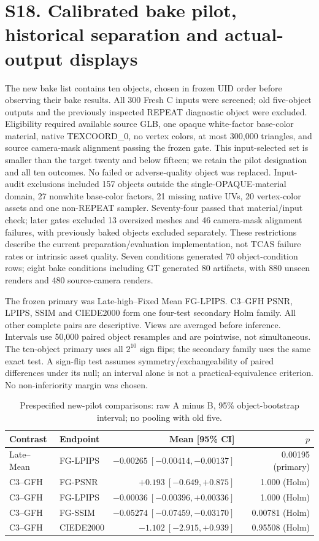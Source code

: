\documentclass[11pt]{article}
\begin{document}
\clearpage
\section*{S18. Calibrated bake pilot, historical separation and actual-output displays}
The new bake list contains ten objects, chosen in frozen UID order before observing their bake results. All 300 Fresh C inputs were screened; old five-object outputs and the previously inspected REPEAT diagnostic object were excluded. Eligibility required available source GLB, one opaque white-factor base-color material, native TEXCOORD\_0, no vertex colors, at most 300,000 triangles, and source camera-mask alignment passing the frozen gate. This input-selected set is smaller than the target twenty and below fifteen; we retain the pilot designation and all ten outcomes. No failed or adverse-quality object was replaced. Input-audit exclusions included 157 objects outside the single-OPAQUE-material domain, 27 nonwhite base-color factors, 21 missing native UVs, 20 vertex-color assets and one non-REPEAT sampler. Seventy-four passed that material/input check; later gates excluded 13 oversized meshes and 46 camera-mask alignment failures, with previously baked objects excluded separately. These restrictions describe the current preparation/evaluation implementation, not TCAS failure rates or intrinsic asset quality. Seven conditions generated 70 object-condition rows; eight bake conditions including GT generated 80 artifacts, with 880 unseen renders and 480 source-camera renders.

The frozen primary was Late-high--Fixed Mean FG-LPIPS. C3--GFH PSNR, LPIPS, SSIM and CIEDE2000 form one four-test secondary Holm family. All other complete pairs are descriptive. Views are averaged before inference. Intervals use 50,000 paired object resamples and are pointwise, not simultaneous. The ten-object primary uses all $2^{10}$ sign flips; the secondary family uses the same exact test. A sign-flip test assumes symmetry/exchangeability of paired differences under its null; an interval alone is not a practical-equivalence criterion. No non-inferiority margin was chosen.

\begin{table}[ht]\centering\scriptsize
\caption{Prespecified new-pilot comparisons: raw A minus B, 95\% object-bootstrap interval; no pooling with old five.}\label{tab:bake-paired}
\begin{tabular}{llrr}
\toprule Contrast & Endpoint & Mean [95\% CI] & $p$ \\
\midrule
Late--Mean & FG-LPIPS & $-0.00265\ [-0.00414,-0.00137]$ & 0.00195 (primary) \\
C3--GFH & FG-PSNR & $+0.193\ [-0.649,+0.875]$ & 1.000 (Holm) \\
C3--GFH & FG-LPIPS & $-0.00036\ [-0.00396,+0.00336]$ & 1.000 (Holm) \\
C3--GFH & FG-SSIM & $-0.05274\ [-0.07459,-0.03170]$ & 0.00781 (Holm) \\
C3--GFH & CIEDE2000 & $-1.102\ [-2.915,+0.939]$ & 0.95508 (Holm) \\
\bottomrule\end{tabular}\end{table}
\end{document}
